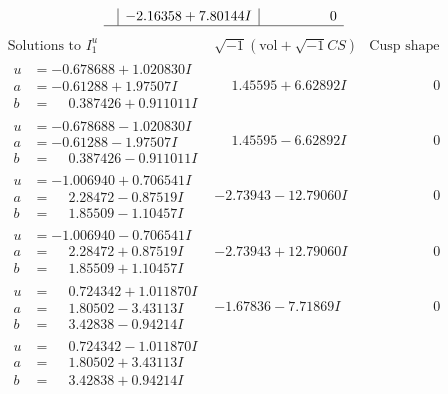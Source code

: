 \documentclass[1p]{elsarticle_modified}
\theoremstyle{definition}
\newcommand{\I}{\sqrt{-1}}
\begin{document}
$$\begin{array}{c|c|c}
 & -2.16358 + 7.80144 I & \phantom{-0.000000 } 0\\
 \hline 
 \end{array}$$\newpage$$\begin{array}{c|c|c}  
\text{Solutions to }I^u_{1}& \I (\text{vol} + \sqrt{-1}CS) & \text{Cusp shape}\\
 \hline 
\begin{aligned}
u &= -0.678688 + 1.020830 I \\
a &= -0.61288 + 1.97507 I \\
b &= \phantom{-}0.387426 + 0.911011 I\end{aligned}
 & \phantom{-}1.45595 + 6.62892 I & \phantom{-0.000000 } 0 \\ \hline\begin{aligned}
u &= -0.678688 - 1.020830 I \\
a &= -0.61288 - 1.97507 I \\
b &= \phantom{-}0.387426 - 0.911011 I\end{aligned}
 & \phantom{-}1.45595 - 6.62892 I & \phantom{-0.000000 } 0 \\ \hline\begin{aligned}
u &= -1.006940 + 0.706541 I \\
a &= \phantom{-}2.28472 - 0.87519 I \\
b &= \phantom{-}1.85509 - 1.10457 I\end{aligned}
 & -2.73943 - 12.79060 I & \phantom{-0.000000 } 0 \\ \hline\begin{aligned}
u &= -1.006940 - 0.706541 I \\
a &= \phantom{-}2.28472 + 0.87519 I \\
b &= \phantom{-}1.85509 + 1.10457 I\end{aligned}
 & -2.73943 + 12.79060 I & \phantom{-0.000000 } 0 \\ \hline\begin{aligned}
u &= \phantom{-}0.724342 + 1.011870 I \\
a &= \phantom{-}1.80502 - 3.43113 I \\
b &= \phantom{-}3.42838 - 0.94214 I\end{aligned}
 & -1.67836 - 7.71869 I & \phantom{-0.000000 } 0 \\ \hline\begin{aligned}
u &= \phantom{-}0.724342 - 1.011870 I \\
a &= \phantom{-}1.80502 + 3.43113 I \\
b &= \phantom{-}3.42838 + 0.94214 I\end{aligned}

\end{array}$$
\end{document}
